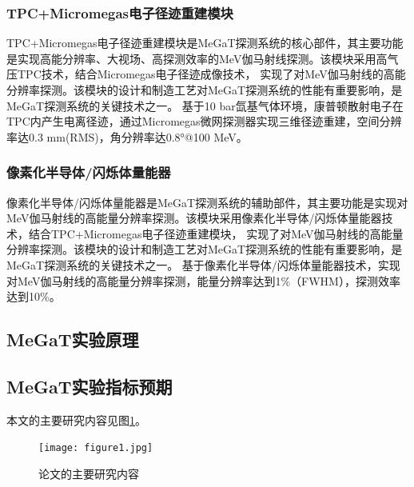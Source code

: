 \subsubsection{TPC+Micromegas电子径迹重建模块}
	TPC+Micromegas电子径迹重建模块是MeGaT探测系统的核心部件，其主要功能是实现高能分辨率、大视场、高探测效率的MeV伽马射线探测。该模块采用高气压TPC技术，结合Micromegas电子径迹成像技术，
	实现了对MeV伽马射线的高能分辨率探测。该模块的设计和制造工艺对MeGaT探测系统的性能有重要影响，是MeGaT探测系统的关键技术之一。
	基于10 bar氙基气体环境，康普顿散射电子在TPC内产生电离径迹，通过Micromegas微网探测器实现三维径迹重建，空间分辨率达0.3 mm(RMS)，角分辨率达0.8°@100 MeV。\par
\subsubsection{像素化半导体/闪烁体量能器}
	像素化半导体/闪烁体量能器是MeGaT探测系统的辅助部件，其主要功能是实现对MeV伽马射线的高能量分辨率探测。该模块采用像素化半导体/闪烁体量能器技术，结合TPC+Micromegas电子径迹重建模块，
	实现了对MeV伽马射线的高能量分辨率探测。该模块的设计和制造工艺对MeGaT探测系统的性能有重要影响，是MeGaT探测系统的关键技术之一。
	基于像素化半导体/闪烁体量能器技术，实现对MeV伽马射线的高能量分辨率探测，能量分辨率达到1\%（FWHM），探测效率达到10\%。\par
\subsection{MeGaT实验原理}

\subsection{MeGaT实验指标预期}


本文的主要研究内容见图\ref{fig:maincontents}。
\begin{figure}[H]
	\centering
	\texttt{[image: figure1.jpg]}
	\caption{论文的主要研究内容} 
	\label{fig:maincontents}
\end{figure}

